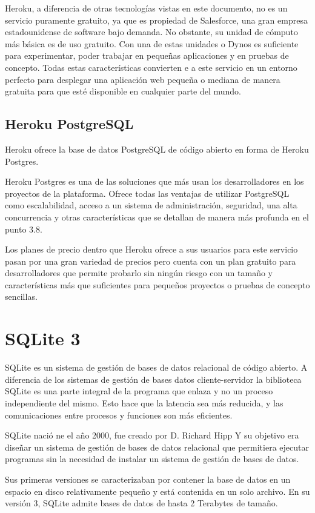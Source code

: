 \documentclass[a4paper, 12pt]{book}
\begin{document}
Heroku, a diferencia de otras tecnologías vistas en este documento, no es un servicio puramente gratuito, ya que es propiedad de Salesforce, una gran empresa estadounidense de software bajo demanda. No obstante, su unidad de cómputo más básica es de uso gratuito. Con una de estas unidades o Dynos es suficiente para experimentar, poder trabajar en pequeñas aplicaciones y en pruebas de concepto. Todas estas características convierten e a este servicio en un entorno perfecto para desplegar una aplicación web pequeña o mediana de manera gratuita para que esté disponible en cualquier parte del mundo. 
\subsection{Heroku PostgreSQL}
Heroku ofrece la base de datos PostgreSQL de código abierto en forma de Heroku Postgres. 

Heroku Postgres es una de las soluciones que más usan los desarrolladores en los proyectos de la plataforma. Ofrece todas las ventajas de utilizar PostgreSQL como escalabilidad, acceso a un sistema de administración, seguridad, una alta concurrencia y otras características que se detallan de manera más profunda en el punto 3.8. 

Los planes de precio dentro que Heroku ofrece a sus usuarios para este servicio pasan por una gran variedad de precios pero cuenta con un plan gratuito para desarrolladores que permite probarlo sin ningún riesgo con un tamaño y características más que suficientes para pequeños proyectos o pruebas de concepto sencillas. 

\section{SQLite 3}
SQLite es un sistema de gestión de bases de datos relacional de código abierto.  A diferencia de los sistemas de gestión de bases datos cliente-servidor la biblioteca SQLite es una parte integral de la programa que enlaza y no un proceso independiente del mismo. Esto hace que la latencia sea más reducida, y las comunicaciones entre procesos y funciones son más eficientes. 

SQLite nació ne el año 2000, fue creado por D. Richard Hipp Y su objetivo era diseñar un sistema de gestión de bases de datos relacional que permitiera ejecutar programas sin la necesidad de instalar un sistema de gestión de bases de datos. 

Sus primeras versiones se caracterizaban por contener la base de datos en un espacio en disco relativamente pequeño y está contenida en un solo archivo. En su versión 3, SQLite admite bases de datos de hasta 2 Terabytes de tamaño. 
\end{document}
